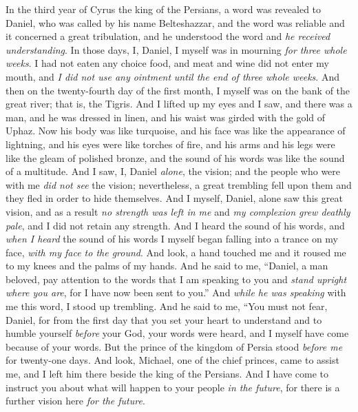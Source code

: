 \begin{biblechapter} %
 In the third year of Cyrus the king of the Persians, a word was revealed to Daniel, who was called by his name Belteshazzar, and the word was reliable and it concerned a great tribulation, and he understood the word and \textit{he received understanding}.
\verse In those days, I, Daniel, I myself was in mourning \textit{for three whole weeks}.
\verse I had not eaten any choice food, and meat and wine did not enter my mouth, and \textit{I did not use any ointment} \textit{until the end of three whole weeks}.
\verse And then on the twenty-fourth day of the first month, I myself was on the bank of the great river; that is, the Tigris.
\verse And I lifted up my eyes and I saw, and there was a man, and he was dressed in linen, and his waist was girded with the gold of Uphaz.
\verse Now his body was like turquoise, and his face was like the appearance of lightning, and his eyes were like torches of fire, and his arms and his legs were like the gleam of polished bronze, and the sound of his words was like the sound of a multitude.
\verse And I saw, I, Daniel \textit{alone}, the vision; and the people who were with me \textit{did not see} the vision; nevertheless, a great trembling fell upon them and they fled in order to hide themselves.
\verse And I myself, Daniel, alone saw this great vision, and as a result \textit{no strength was left in me} and \textit{my complexion grew deathly pale}, and I did not retain any strength.
\verse And I heard the sound of his words, and \textit{when I heard} the sound of his words I myself began falling into a trance on my face, \textit{with my face to the ground}.
\verse And look, a hand touched me and it roused me to my knees and the palms of my hands.
\verse And he said to me, “Daniel, a man beloved, pay attention to the words that I am speaking to you and \textit{stand upright where you are}, for I have now been sent to you.” And \textit{while he was speaking} with me this word, I stood up trembling.
\verse And he said to me, “You must not fear, Daniel, for from the first day that you set your heart to understand and to humble yourself \textit{before} your God, your words were heard, and I myself have come because of your words.
\verse But the prince of the kingdom of Persia stood \textit{before me} for twenty-one days. And look, Michael, one of the chief princes, came to assist me, and I left him there beside the king of the Persians.
\verse And I have come to instruct you about what will happen to your people \textit{in the future}, for there is a further vision here \textit{for the future}.

\end{biblechapter}
